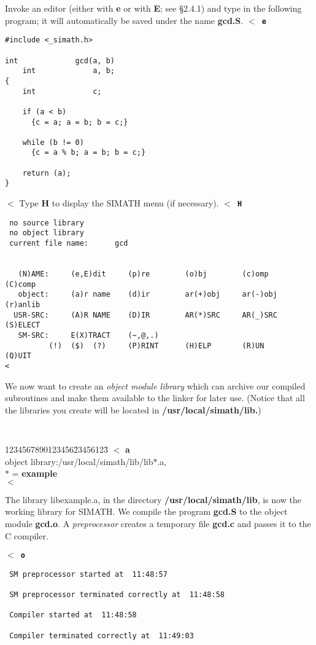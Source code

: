 Invoke an editor (either with {\bf e} or with {\bf E}; see \S 2.4.1) and
type in the following program; it will automatically be saved  under
the name {\bf gcd.S}.
\leer
{\tt $<$ {\bf e} \care}
\begin{verbatim}
#include <_simath.h>

int             gcd(a, b)
    int             a, b;
{
    int             c;
    
    if (a < b) 
      {c = a; a = b; b = c;}
    
    while (b != 0) 
      {c = a % b; a = b; b = c;}
    
    return (a);
}
\end{verbatim}
$<$   
\leer
Type {\bf H} to display the SIMATH menu (if necessary).
\leer
{\tt $<$ {\bf H} \care} 
\begin{verbatim}
 no source library
 no object library
 current file name:      gcd


   (N)AME:     (e,E)dit     (p)re        (o)bj        (c)omp       (C)comp 
   object:     (a)r name    (d)ir        ar(+)obj     ar(-)obj     (r)anlib
  USR-SRC:     (A)R NAME    (D)IR        AR(*)SRC     AR(_)SRC     (S)ELECT
   SM-SRC:     E(X)TRACT    (~,@,.)                                        
          (!)  ($)  (?)     (P)RINT      (H)ELP       (R)UN        (Q)UIT  
<
\end{verbatim}

We now want to create  an {\em object module library\/} which can archive
our compiled subroutines and make them available to the linker for later use.  
(Notice that all the libraries you create will be located in 
{\bf /usr/local/simath/lib.})
{\tt
\begin{tabbing}
1234567890123456\=23456123\=\kill
$<$ {\bf a} \care {} \\
object library:\>/usr/local/simath/lib/lib$*$.a,\\
                  \>$*$ = {\bf example  \care }\\
$<$ \>   
\end{tabbing} }

The library libexample.a, in the directory {\bf /usr/local/simath/lib}, is now
the working library for SIMATH. We compile the program {\bf gcd.S} to
the object module {\bf gcd.o}. A {\em preprocessor\/} creates a temporary file
{\bf gcd.c} and passes it to the C compiler.

{\tt $<$ {\bf o} \care}
\begin{verbatim}
 SM preprocessor started at  11:48:57

 SM preprocessor terminated correctly at  11:48:58

 Compiler started at  11:48:58

 Compiler terminated correctly at  11:49:03
\end{verbatim}

